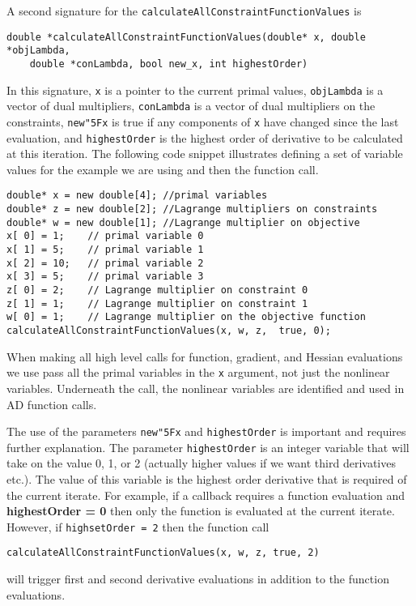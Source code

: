 \documentclass[11pt]{article}
\renewcommand{\_}{{\char"5F}}
\renewcommand{\{}{{\char"7B}}
\renewcommand{\}}{{\char"7D}}
\renewcommand{\^}{{\char"0D}}
\renewcommand{\'}{{\char"0D}}
\begin{document}
A second signature for the {\tt calculateAllConstraintFunctionValues} is
\begin{verbatim}
double *calculateAllConstraintFunctionValues(double* x, double *objLambda, 
    double *conLambda, bool new_x, int highestOrder)
\end{verbatim}
In this  signature, {\tt x} is a pointer to the current primal values, {\tt objLambda} is a vector of dual multipliers, {\tt conLambda} is a vector of dual multipliers on the constraints,  {\tt new\_x} is true if any components of {\tt x} have changed since the last evaluation, and {\tt highestOrder} is the highest order of derivative to be calculated at this iteration. The following code snippet illustrates defining a set of variable values for the example we are using and then the function call.
\begin{verbatim}
double* x = new double[4]; //primal variables
double* z = new double[2]; //Lagrange multipliers on constraints
double* w = new double[1]; //Lagrange multiplier on objective
x[ 0] = 1;    // primal variable 0
x[ 1] = 5;    // primal variable 1
x[ 2] = 10;   // primal variable 2
x[ 3] = 5;    // primal variable 3
z[ 0] = 2;    // Lagrange multiplier on constraint 0
z[ 1] = 1;    // Lagrange multiplier on constraint 1
w[ 0] = 1;    // Lagrange multiplier on the objective function
calculateAllConstraintFunctionValues(x, w, z,  true, 0);
\end{verbatim}
When making all high level calls for function, gradient, and Hessian evaluations we use pass all the primal variables in the {\tt x} argument, not just the nonlinear variables. Underneath the call, the nonlinear variables are identified and used in AD function calls. 

The use of the parameters  {\tt new\_x} and {\tt highestOrder}  is important and requires further explanation.    The parameter  {\tt highestOrder}  is an integer variable that will take on the value 0, 1, or 2 (actually higher values if we want third derivatives etc.).  The value of this variable is the highest order derivative that is required of the current iterate. For example, if  a callback requires a function evaluation and {\bf highestOrder = 0} then only the function is evaluated at the current iterate.  However,  if {\tt highsetOrder = 2} then the function call
\begin{verbatim}
calculateAllConstraintFunctionValues(x, w, z, true, 2)
\end{verbatim}  
will trigger  first and second derivative evaluations in addition to the function evaluations.
\end{document}

